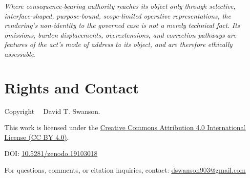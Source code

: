 \documentclass[11pt]{article}
\renewenvironment{quote}
  {\list{}{\leftmargin=1.4em \rightmargin=1.0em}%
   \item\relax\color{softink}\itshape}
  {\endlist}
\begin{document}
\begin{quote}
Where consequence-bearing authority reaches its object only through selective, interface-shaped, purpose-bound, scope-limited operative representations, the rendering's non-identity to the governed case is not a merely technical fact. Its omissions, burden displacements, overextensions, and correction pathways are features of the act's mode of address to its object, and are therefore ethically assessable.
\end{quote}

\appendix


\section*{Rights and Contact}

\noindent
Copyright \textcopyright\ \the\year\ David T. Swanson.

\noindent
This work is licensed under the
\href{https://creativecommons.org/licenses/by/4.0/}
{Creative Commons Attribution 4.0 International License (CC BY 4.0)}.

\noindent
DOI:
\href{https://doi.org/10.5281/zenodo.19103018}{10.5281/zenodo.19103018}

\noindent
For questions, comments, or citation inquiries, contact:
\href{mailto:dswanson903@gmail.com}{dswanson903@gmail.com}
\end{document}
